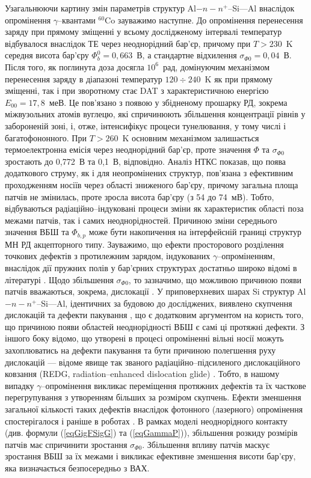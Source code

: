 Узагальнюючи картину змін параметрів структур Al$-n-n^+$--Si---Al внаслідок опромінення $\gamma$--квантами $^{60}$Co зауважимо наступне.
До опромінення перенесення заряду при прямому зміщенні у всьому дослідженому інтервалі температур відбувалося внаслідок ТЕ через неоднорідний бар'єр,
причому при $T>230$~K середня висота бар'єру $\Phi_b^0=0,663$~В, а стандартне відхилення $\sigma_{\Phi0}=0,04$~В.
Після того, як поглинута доза досягла $10^6$~рад, домінуючим механізмом перенесення заряду в діапазоні температур
$120\div240$~K як при прямому зміщенні, так і при зворотному стає DAT з характеристичною енергією $E_{00}=17,8$~меВ.
Це пов'язано з появою у збідненому прошарку РД, зокрема міжвузольних атомів вуглецю, які спричинюють збільшення
концентрації рівнів у забороненій зоні, і, отже, інтенсифікує процеси тунелювання, у тому числі і багатофононного.
При $T>260$~K основним механізмом залишається термоелектронна емісія через неоднорідний бар'єр, проте значення $\Phi$ та $\sigma_{\Phi0}$
зростають до 0,772~В та 0,1~В, відповідно.
Аналіз НТКС показав, що поява додаткового струму, як і для неопромінених структур, пов'язана з ефективним проходженням носіїв через області зниженого бар'єру,
причому загальна площа патчів не змінилась, проте зросла висота бар'єру (з 54 до 74~мВ).
Тобто, відбуваються радіаційно--індуковані процеси зміни як характеристик області поза межами патчів, так і самих неоднорідностей.
Причиною зміни середнього значення ВБШ та $\Phi_{b,p}$ може бути накопичення на інтерфейсній границі структур МН
РД акцепторного типу.
Зауважимо, що ефекти просторового розділення точкових дефектів з протилежним зарядом, індукованих $\gamma$--опроміненням, внаслідок дії пружних полів
у бар'єрних структурах достатньо широко відомі в літературі \cite{Shcherb, Muzafarova}.
Щодо збільшення $\sigma_{\Phi0}$, то зазначимо, що можливою причиною появи патчів вважаються, зокрема, дислокації \cite{GELCZUK2014}.
У приповерхневих шарах Si структур Al$-n-n^+$--Si---Al, ідентичних за будовою до досліджених, виявлено скупчення дислокацій та дефекти пакування \cite{VOROBETS2005,Vorobets},
що є додатковим аргументом на користь того, що причиною появи областей неоднорідності ВБШ є самі ці протяжні дефекти.
З іншого боку відомо, що утворені в процесі опроміненні вільні носії можуть захоплюватись на дефекти пакування та бути причиною
полегшення руху дислокацій --- відоме явище так званого радіаційно--підсиленого дислокаційного ковзання (REDG, radiation--enhanced dislocation glide) \cite{REDG}.
Тобто, в нашому випадку $\gamma$--опромінення викликає переміщення протяжних дефектів та їх часткове перегрупування з утворенням більших за розміром
скупчень.
Ефекти зменшення загальної кількості таких дефектів внаслідок фотонного (лазерного) опромінення спостерігалося і раніше в роботах \cite{VOROBETS2005,Vorobets}.
В рамках моделі неоднорідного контакту (див. формули (\ref{eqGigFSigG}) та (\ref{eqGammaP})), збільшення розкиду розмірів патчів має спричинити зростання $\sigma_{\Phi0}$.
Збільшення впливу патчів маскує зростання ВБШ за їх межами і викликає ефективне зменшення висоти бар'єру, яка визначається безпосередньо з ВАХ.

